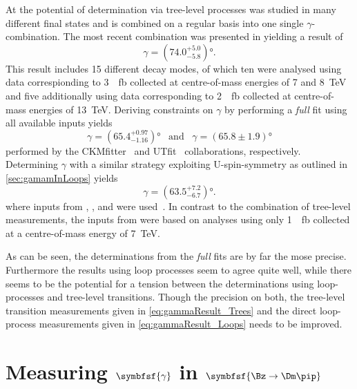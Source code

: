 At \lhcb the potential of determination via tree-level processes was studied in many different final states and is combined on a regular basis into one single $\gamma$-combination. The most recent combination was presented in \cite{GammCombo} yielding a result of
\begin{equation}
\gamma=\left(74.0^{+5.0}_{-5.8}\right)\!\si{\degree}.\label{eq:gammaResult_Trees}
\end{equation}
This result includes \num{15} different decay modes, of which ten were analysed using data correspionding to \SI{3}{\per\femto\barn} collected at centre-of-mass energies of \num{7} and \SI{8}{\tera\electronvolt} and five additionally using data corresponding to \SI{2}{\per\femto\barn} collected at centre-of-mass energies of \SI{13}{\tera\electronvolt}.
Deriving constraints on $\gamma$ by performing a \emph{full} fit using all available inputs yields
\begin{equation}
\gamma=\left(65.4^{+0.97}_{-1.16}\right)\!\si{\degree}\,\,\,\,\,\text{and}\,\,\,\,\,\gamma=\left(65.8\pm1.9\right)\!\si{\degree}
\end{equation}
performed by the CKMfitter~\cite{CKMfitter2015} and UTfit~\cite{UTfit-UT} collaborations, respectively.
Determining $\gamma$ with a similar strategy exploiting U-spin-symmetry as outlined in \cref{sec:gamamInLoops} yields
\begin{equation}
\gamma=\left(63.5^{+7.2}_{-6.7}\right)\!\si{\degree}.\label{eq:gammaResult_Loops}
\end{equation}
where inputs from \babar, \belle, \cdf and \lhcb were used~\cite{Aaij:2014xba}. In contrast to the combination of tree-level measurements, the inputs from \lhcb were based on analyses using only \SI{1}{\per\femto\barn} collected at a centre-of-mass energy of \SI{7}{\tera\electronvolt}.

As can be seen, the determinations from the \emph{full} fits are by far the mose precise.
Furthermore the results using loop processes seem to agree quite well, while there seems to be the potential for a tension between the determinations using loop-processes and tree-level transitions.
Though the precision on both, the tree-level transition measurements given in \cref{eq:gammaResult_Trees} and the direct loop-process measurements given in \cref{eq:gammaResult_Loops} needs to be improved.

\section[head={Measuring $\gamma$ in $\Bz\to\Dm\pip$},tocentry={Measuring $\gamma$ in $\Bz\to\Dm\pip$}]{Measuring $\symbfsf{\gamma}$ in $\symbfsf{\Bz\to\Dm\pip}$}
\label{sec:GammaInBd2Dpi}

